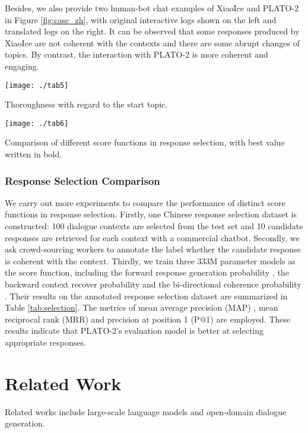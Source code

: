 \documentclass[11pt,a4paper]{article}
\begin{document}
	Besides, we also provide two human-bot chat examples of XiaoIce and PLATO-2 in Figure \ref{fig:case_zh}, with original interactive logs shown on the left and translated logs on the right. It can be observed that some responses produced by XiaoIce are not coherent with the contexts and there are some abrupt changes of topics. By contrast, the interaction with PLATO-2 is more coherent and engaging. 
	\begin{table}
		\centering
		\texttt{[image: ./tab5]}
		\caption{Thoroughness with regard to the start topic.}
		\label{tab:thorough}
	\end{table} 
	\begin{table}
		\centering
		\texttt{[image: ./tab6]}
		\caption{Comparison of different score functions in response selection, with best value written in bold.}
		\label{tab:selection}
	\end{table} 
	
	\subsubsection{Response Selection Comparison}
	We carry out more experiments to compare the performance of distinct score functions in response selection. Firstly, one Chinese response selection dataset is constructed: 100 dialogue contexts are selected from the test set and 10 candidate responses are retrieved for each context with a commercial chatbot. Secondly, we ask crowd-sourcing workers to annotate the label whether the candidate response is coherent with the context. Thirdly, we train three 333M parameter models as the score function, including the forward response generation probability , the backward context recover probability  and the bi-directional coherence probability . Their results on the annotated response selection dataset are summarized in Table \ref{tab:selection}. The metrics of mean average precision (MAP) \cite{baeza1999modern}, mean reciprocal rank (MRR) \cite{voorhees1999trec} and precision at position 1 (P@1) are employed. These results indicate that PLATO-2's evaluation model is better at selecting appropriate responses. 
	


	\section{Related Work}
	Related works include large-scale language models and open-domain dialogue generation.
	
\end{document}
